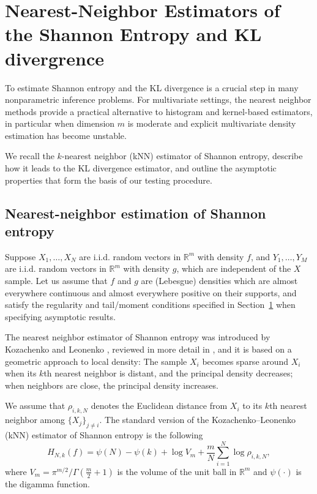 \documentclass[12pt,a4paper]{article}
\newcommand{\R}{\mathbb R}
\theoremstyle{definition}
\theoremstyle{plain}
\begin{document}
{%
\section{Nearest-Neighbor Estimators of the Shannon Entropy and KL divergrence}
\label{sec:kl_estimation}

To estimate Shannon entropy and the KL divergence is a crucial step in many nonparametric inference problems. For multivariate settings, the nearest neighbor methods provide a practical alternative to histogram and kernel-based estimators, in particular when dimension $m$ is moderate and explicit multivariate density estimation has become unstable.

We recall the $k$-nearest neighbor (kNN) estimator of Shannon entropy, describe how it leads to the KL divergence estimator, and outline the asymptotic properties that form the basis of our testing procedure.


\subsection{Nearest-neighbor estimation of Shannon entropy}

Suppose {${X}_1,\dots,{X}_N$} are i.i.d. random vectors in $\R^m$ with density $f$, and $Y_1,\dots,Y_M$ are i.i.d. random vectors in $\R^m$ with density $g$, which are independent of the $X$ sample. Let us assume that $f$ and $g$ are (Lebesgue) densities which are almost everywhere continuous and almost everywhere positive on their supports, and satisfy the regularity and tail/moment conditions specified in Section~\ref{sec:kl_estimation} when specifying asymptotic results.

The nearest neighbor estimator of Shannon entropy was introduced by Kozachenko and Leonenko \cite{kozachenko1987}, reviewed in more detail in \cite{goria2005,leonenko2008}, and it is based on a geometric approach to local density: The sample $X_i$ becomes sparse around $X_i$ when its $k$th nearest neighbor is distant, and the principal density decreases; when neighbors are close, the principal density increases.

We assume that $\rho_{i,k,N}$ denotes the Euclidean distance from $X_i$ to its $k$th nearest neighbor among $\{X_j\}_{j\neq i}$. The standard version of the Kozachenko–Leonenko (kNN) estimator of Shannon entropy is the following
\begin{equation}\label{eq:kNN_entropy_estimator}
\widehat{H}_{N,k}(f)
= \psi(N) - \psi(k) + \log V_m + \frac{m}{N}\sum_{i=1}^{N}\log \rho_{i,k,N},
\end{equation}
where $V_m = \pi^{m/2}/\Gamma(\frac{m}{2}+1)$ is the volume of the unit ball in $\mathbb{R}^m$ and $\psi(\cdot)$ is the digamma function.

}
\end{document}
